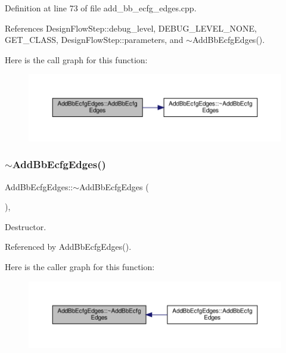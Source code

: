 Definition at line 73 of file add\+\_\+bb\+\_\+ecfg\+\_\+edges.\+cpp.



References Design\+Flow\+Step\+::debug\+\_\+level, D\+E\+B\+U\+G\+\_\+\+L\+E\+V\+E\+L\+\_\+\+N\+O\+NE, G\+E\+T\+\_\+\+C\+L\+A\+SS, Design\+Flow\+Step\+::parameters, and $\sim$\+Add\+Bb\+Ecfg\+Edges().

Here is the call graph for this function\+:
\nopagebreak
\begin{figure}[H]
\begin{center}
\leavevmode
\includegraphics[width=350pt]{d8/d78/classAddBbEcfgEdges_a8305f7f604fc970848c20f6b8af41416_cgraph}
\end{center}
\end{figure}
\mbox{\label{classAddBbEcfgEdges_a2a2bac0c88dae905633dbccd7bc11e21}} 
\subsubsection{\texorpdfstring{$\sim$\+Add\+Bb\+Ecfg\+Edges()}{~AddBbEcfgEdges()}}
{\footnotesize\ttfamily Add\+Bb\+Ecfg\+Edges\+::$\sim$\+Add\+Bb\+Ecfg\+Edges (\begin{DoxyParamCaption}{ }\end{DoxyParamCaption})\hspace{0.3cm}{\ttfamily [override]}, {\ttfamily [default]}}



Destructor. 



Referenced by Add\+Bb\+Ecfg\+Edges().

Here is the caller graph for this function\+:
\nopagebreak
\begin{figure}[H]
\begin{center}
\leavevmode
\includegraphics[width=350pt]{d8/d78/classAddBbEcfgEdges_a2a2bac0c88dae905633dbccd7bc11e21_icgraph}
\end{center}
\end{figure}



